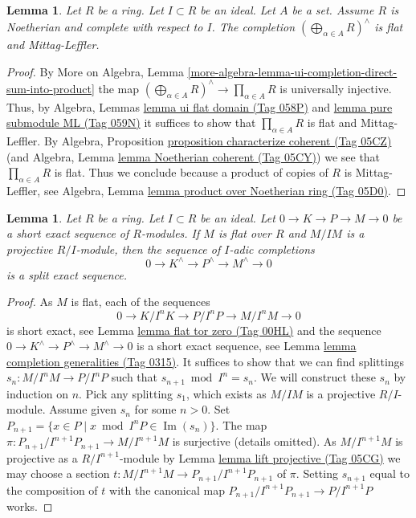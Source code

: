 \documentclass{amsart}
\theoremstyle{plain}
\newtheorem{lemma}[subsection]{Lemma}
\theoremstyle{definition}
\theoremstyle{remark}
\numberwithin{equation}{subsection}
\def\Im{\mathop{\mathrm{Im}}}
\begin{document}
\begin{lemma}
\label{lemma-completed-direct-sum-ML}
Let $R$ be a ring. Let $I \subset R$ be an ideal. Let $A$ be a set.
Assume $R$ is Noetherian and complete with respect to $I$. The completion
$(\bigoplus\nolimits_{\alpha \in A} R)^\wedge$
is flat and Mittag-Leffler.
\end{lemma}

\begin{proof}
By
More on Algebra, Lemma
\ref{more-algebra-lemma-ui-completion-direct-sum-into-product}
the map $(\bigoplus\nolimits_{\alpha \in A} R)^\wedge
\to \prod_{\alpha \in A} R$ is universally injective.
Thus, by
Algebra, Lemmas \href{https://stacks.math.columbia.edu/tag/058P}{lemma ui flat domain (Tag 058P)} and
\href{https://stacks.math.columbia.edu/tag/059N}{lemma pure submodule ML (Tag 059N)}
it suffices to show that $\prod_{\alpha \in A} R$ is flat and Mittag-Leffler.
By
Algebra, Proposition \href{https://stacks.math.columbia.edu/tag/05CZ}{proposition characterize coherent (Tag 05CZ)}
(and
Algebra, Lemma \href{https://stacks.math.columbia.edu/tag/05CY}{lemma Noetherian coherent (Tag 05CY)})
we see that $\prod_{\alpha \in A} R$ is flat.
Thus we conclude because a product of copies of $R$ is Mittag-Leffler, see
Algebra, Lemma \href{https://stacks.math.columbia.edu/tag/05D0}{lemma product over Noetherian ring (Tag 05D0)}.
\end{proof}


\begin{lemma}
\label{algebra-lemma-split-completed-sequence}
Let $R$ be a ring. Let $I \subset R$ be an ideal.
Let $0 \to K \to P \to M \to 0$ be a short exact sequence of
$R$-modules. If $M$ is flat over $R$ and $M/IM$ is a projective
$R/I$-module, then the sequence of $I$-adic completions
$$
0 \to K^\wedge \to P^\wedge \to M^\wedge \to 0
$$
is a split exact sequence.
\end{lemma}

\begin{proof}
As $M$ is flat, each of the sequences
$$
0 \to K/I^nK \to P/I^nP \to M/I^nM \to 0
$$
is short exact, see
Lemma \href{https://stacks.math.columbia.edu/tag/00HL}{lemma flat tor zero (Tag 00HL)}
and the sequence $0 \to K^\wedge \to P^\wedge \to M^\wedge \to 0$
is a short exact sequence, see
Lemma \href{https://stacks.math.columbia.edu/tag/0315}{lemma completion generalities (Tag 0315)}.
It suffices to show that we can find splittings
$s_n : M/I^nM \to P/I^nP$ such that $s_{n + 1} \bmod I^n = s_n$.
We will construct these $s_n$ by induction on $n$.
Pick any splitting $s_1$, which exists as $M/IM$ is a projective $R/I$-module.
Assume given $s_n$ for some $n > 0$. Set
$P_{n + 1} = \{x \in P \mid x \bmod I^nP \in \Im(s_n)\}$.
The map $\pi : P_{n + 1}/I^{n + 1}P_{n + 1} \to M/I^{n + 1}M$ is surjective
(details omitted). As $M/I^{n + 1}M$ is projective as a $R/I^{n + 1}$-module
by
Lemma \href{https://stacks.math.columbia.edu/tag/05CG}{lemma lift projective (Tag 05CG)}
we may choose a section
$t : M/I^{n + 1}M \to P_{n + 1}/I^{n + 1}P_{n + 1}$
of $\pi$. Setting $s_{n + 1}$ equal to the composition of
$t$ with the canonical map $P_{n + 1}/I^{n + 1}P_{n + 1} \to P/I^{n + 1}P$
works.
\end{proof}
\end{document}
